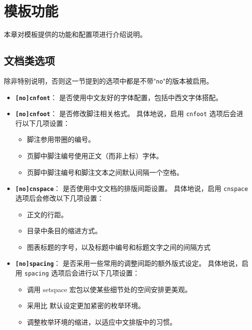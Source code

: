 \chapter{模板功能}
本章对模板提供的功能和配置项进行介绍说明。

\section{文档类选项}
\label{sec:option}

除非特别说明，否则这一节提到的选项中都是不带"\verb|no|"的版本被启用。

\begin{itemize}
    \item \textbf{\texttt{[no]cnfont}}：
        是否使用中文友好的字体配置，包括中西文字体搭配。

    \item \textbf{\texttt{[no]cnfoot}}：
        是否修改脚注相关格式。
        具体地说，启用 \verb|cnfoot| 选项后会进行以下几项设置：
    \begin{itemize}
        \item 脚注参用带圈的编号。
        \item 页脚中脚注编号使用正文（而非上标）字体。
        \item 页脚中脚注编号和脚注文本之间默认间隔一个空格。
    \end{itemize}

    \item \textbf{\texttt{[no]cnspace}}：
        是否使用中文文档的排版间距设置。
        具体地说，启用 \verb|cnspace| 选项后会修改以下几项设置：
    \begin{itemize}
        \item 正文的行距。
        \item 目录中条目的缩进方式。
        \item 图表标题的字号，以及标题中编号和标题文字之间的间隔方式
    \end{itemize}

    \item \textbf{\texttt{[no]spacing}}：
        是否采用一些常用的调整间距的额外版式设定。
        具体地说，启用 \verb|spacing| 选项后会进行以下几项设置：
    \begin{itemize}
        \item 调用 setspace 宏包以使某些细节处的空间安排更美观。
        \item 采用比  默认设定更加紧密的枚举环境。
        \item 调整枚举环境的缩进，以适应中文排版中的习惯。
    \end{itemize}


\end{itemize}
